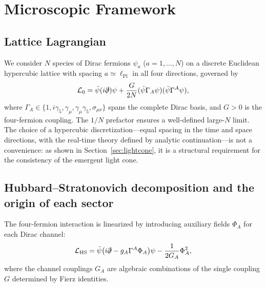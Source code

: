 \documentclass[11pt,a4paper]{article}
\begin{document}
\section{Microscopic Framework}
\label{sec:micro}

\subsection{Lattice Lagrangian}

We consider $N$ species of Dirac fermions $\psi_a$
($a = 1, \ldots, N$) on a discrete Euclidean hypercubic lattice
with spacing $a \simeq \ell_{\mathrm{Pl}}$ in all four directions,
governed by
\begin{equation}
\mathcal{L}_0 = \bar{\psi}(i\slashed{\partial})\psi
+ \frac{G}{2N}(\bar{\psi}\Gamma_A\psi)(\bar{\psi}\Gamma^A\psi),
\label{eq:L0}
\end{equation}
where $\Gamma_A \in \{1, i\gamma_5, \gamma_\mu,
\gamma_\mu\gamma_5, \sigma_{\mu\nu}\}$ spans the complete
Dirac basis, and $G > 0$ is the four-fermion coupling.
The $1/N$ prefactor ensures a well-defined large-$N$ limit.
The choice of a hypercubic discretization---equal spacing in the
time and space directions, with the real-time theory defined by
analytic continuation---is not a convenience: as shown in
Section~\ref{sec:lightcone}, it is a structural requirement for
the consistency of the emergent light cone.

\subsection{Hubbard--Stratonovich decomposition and the origin of
each sector}

The four-fermion interaction is linearized by introducing
auxiliary fields $\Phi_A$ for each Dirac channel:
\begin{equation}
\mathcal{L}_{\mathrm{HS}} = \bar{\psi}
\bigl(i\slashed{\partial} - g_A\Gamma^A\Phi_A\bigr)\psi
- \frac{1}{2G_A}\Phi_A^2,
\label{eq:HS}
\end{equation}
where the channel couplings $G_A$ are algebraic combinations
of the single coupling $G$ determined by Fierz identities.
\end{document}
